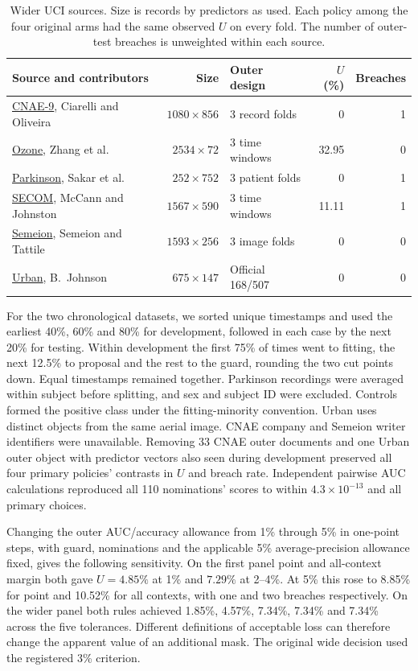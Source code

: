 \begin{table}[htb]
\centering\small
\caption{Wider UCI sources. Size is records by predictors as used. Each policy among the four original arms had the same observed $U$ on every fold. The number of outer-test breaches is unweighted within each source.}
\label{tab:wide-tasks}
\begin{tabular}{@{}lrlrr@{}}
\toprule
Source and contributors & Size & Outer design & $U$ (\%) & Breaches\\
\midrule
\href{https://doi.org/10.24432/C51G7P}{CNAE-9}, Ciarelli and Oliveira & $1080\times856$ & 3 record folds & 0 & 1\\
\href{https://doi.org/10.24432/C5NG6W}{Ozone}, Zhang et al. & $2534\times72$ & 3 time windows & 32.95 & 0\\
\href{https://doi.org/10.24432/C5MS4X}{Parkinson}, Sakar et al. & $252\times752$ & 3 patient folds & 0 & 1\\
\href{https://doi.org/10.24432/C54305}{SECOM}, McCann and Johnston & $1567\times590$ & 3 time windows & 11.11 & 1\\
\href{https://doi.org/10.24432/C5SC8V}{Semeion}, Semeion and Tattile & $1593\times256$ & 3 image folds & 0 & 0\\
\href{https://doi.org/10.24432/C53S48}{Urban}, B.~Johnson & $675\times147$ & Official 168/507 & 0 & 0\\
\bottomrule
\end{tabular}
\end{table}

For the two chronological datasets, we sorted unique timestamps and used the earliest 40\%, 60\% and 80\% for development, followed in each case by the next 20\% for testing. Within development the first 75\% of times went to fitting, the next 12.5\% to proposal and the rest to the guard, rounding the two cut points down. Equal timestamps remained together. Parkinson recordings were averaged within subject before splitting, and sex and subject ID were excluded. Controls formed the positive class under the fitting-minority convention. Urban uses distinct objects from the same aerial image. CNAE company and Semeion writer identifiers were unavailable. Removing 33 CNAE outer documents and one Urban outer object with predictor vectors also seen during development preserved all four primary policies' contrasts in $U$ and breach rate. Independent pairwise AUC calculations reproduced all 110 nominations' scores to within $4.3\times10^{-13}$ and all primary choices.

Changing the outer AUC/accuracy allowance from 1\% through 5\% in one-point steps, with guard, nominations and the applicable 5\% average-precision allowance fixed, gives the following sensitivity. On the first panel point and all-context margin both gave $U=4.85\%$ at 1\% and $7.29\%$ at 2--4\%. At 5\% this rose to 8.85\% for point and 10.52\% for all contexts, with one and two breaches respectively. On the wider panel both rules achieved 1.85\%, 4.57\%, 7.34\%, 7.34\% and 7.34\% across the five tolerances. Different definitions of acceptable loss can therefore change the apparent value of an additional mask. The original wide decision used the registered 3\% criterion.

